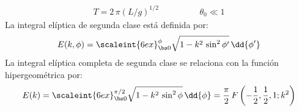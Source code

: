 \begin{align*}
T = 2 \, \pi (L / g)^{1/2} \hspace{2cm} \theta_{0} \ll 1
\end{align*}
La integral elíptica de segunda clase está definida por:
\begin{align*}
E (k, \phi) = \scaleint{6ex}_{\bs 0}^{\phi} \sqrt{1 - k^{2} \, \sin^{2} \phi^{\prime}} \, \dd{\phi^{\prime}}
\end{align*}
La integral elíptica completa de segunda clase se relaciona con la función hipergeométrica por:
\begin{equation}
E(k) = \scaleint{6ex}_{\bs 0}^{\pi/2} \sqrt{1 - k^{2} \, \sin^{2} \phi} \, \dd{\phi} =  \dfrac{\pi}{2} \, F \left( -\dfrac{1}{2}, \dfrac{1}{2}, 1; k^{2} \right)
\end{equation}



